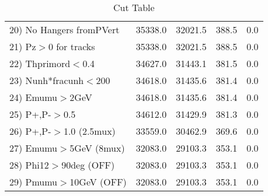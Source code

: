 \begin{table}[h!]
\begin{tabular}{||l||r|r|r|r||}
 20) No Hangers fromPVert &     35338.0 &     32021.5 &       388.5 &         0.0 \\
 21) Pz$>$0 for tracks    &     35338.0 &     32021.5 &       388.5 &         0.0 \\
 22) Thprimord$<$0.4      &     34627.0 &     31443.1 &       381.5 &         0.0 \\
 23) Nunh*fracunh$<$200   &     34618.0 &     31435.6 &       381.4 &         0.0 \\
 24) Emumu$>$2GeV         &     34618.0 &     31435.6 &       381.4 &         0.0 \\
 25) P+,P-$>$0.5          &     34612.0 &     31429.9 &       381.3 &         0.0 \\
 26) P+,P-$>$1.0 (2.5mux) &     33559.0 &     30462.9 &       369.6 &         0.0 \\
 27) Emumu$>$5GeV  (8mux) &     32083.0 &     29103.3 &       353.1 &         0.0 \\
 28) Phi12$>$90deg  (OFF) &     32083.0 &     29103.3 &       353.1 &         0.0 \\
 29) Pmumu$>$10GeV  (OFF) &     32083.0 &     29103.3 &       353.1 &         0.0 \\
 \hline
 \hline
 \end{tabular}
 \caption{Cut Table \cohpip }
 \label{tab-cut_copip}
 \end{table}
